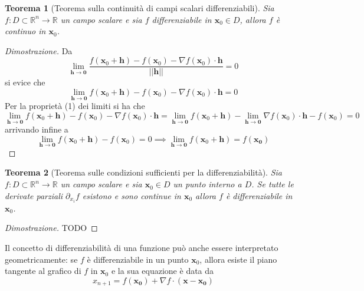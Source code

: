 \documentclass{article}
\newtheorem{theorem}{Teorema}
\begin{document}
            \begin{theorem} [Teorema sulla continuità di campi scalari differenziabili]
                Sia $f: D \subset \mathbb{R}^{n} \rightarrow \mathbb{R}$ un campo scalare e sia $f$ differenziabile in $\mathbf{x}_0 \in D$, allora $f$ è continuo in $\mathbf{x}_0$.
            \end{theorem}

            \begin{proof} [Dimostrazione]
                Da 
                \[
                    \lim_{\mathbf{h} \rightarrow \mathbf{0}} \frac{f(\mathbf{x}_0 + \mathbf{h}) - f(\mathbf{x}_0) - \nabla f(\mathbf{x}_0) \cdot \mathbf{h}}{|| \mathbf{h} ||} = 0
                \]
                si evice che 
                \[
                    \lim_{\mathbf{h} \rightarrow \mathbf{0}} f(\mathbf{x}_0 + \mathbf{h}) - f(\mathbf{x}_0) - \nabla f(\mathbf{x}_0) \cdot \mathbf{h} = 0
                \]
                Per la proprietà (1) dei limiti si ha che
                \[
                    \lim_{\mathbf{h} \rightarrow \mathbf{0}} f(\mathbf{x}_0 + \mathbf{h}) - f(\mathbf{x}_0) - \nabla f(\mathbf{x}_0) \cdot \mathbf{h}  = \lim_{\mathbf{h} \rightarrow \mathbf{0}} f(\mathbf{x}_0 + \mathbf{h}) - \lim_{\mathbf{h} \rightarrow \mathbf{0}} \nabla f(\mathbf{x}_0) \cdot \mathbf{h} - f(\mathbf{x}_0)= 0
                \]
                arrivando infine a
                \[
                    \lim_{\mathbf{h} \rightarrow \mathbf{0}} f(\mathbf{x}_0 + \mathbf{h}) - f(\mathbf{x}_0) = 0 \implies \lim_{\mathbf{h} \rightarrow \mathbf{0}} f(\mathbf{x}_0 + \mathbf{h}) = f(\mathbf{x_0})
                \]
            \end{proof}

            \begin{theorem} [Teorema sulle condizioni sufficienti per la differenziabilità]
                Sia $f: D \subset \mathbb{R}^{n} \rightarrow \mathbb{R}$ un campo scalare e sia $\mathbf{x}_0 \in D$ un punto interno a $D$. Se tutte le derivate parziali $\partial_{x_i} f$ esistono e sono continue in $\mathbf{x}_0$ allora $f$ è differenziabile in $\mathbf{x}_0$.
            \end{theorem}

            \begin{proof} [Dimostrazione]
                TODO
            \end{proof}

            Il concetto di differenziabilità di una funzione può anche essere interpretato geometricamente: se $f$ è differenziabile in un punto $\mathbf{x}_0$, allora 
            esiste il piano tangente al grafico di $f$ in $\mathbf{x}_0$ e la sua equazione è data da
            \[
                x_{n + 1} = f(\mathbf{x_0}) + \nabla f \cdot (\mathbf{x} - \mathbf{x_0})
            \]
\end{document}
